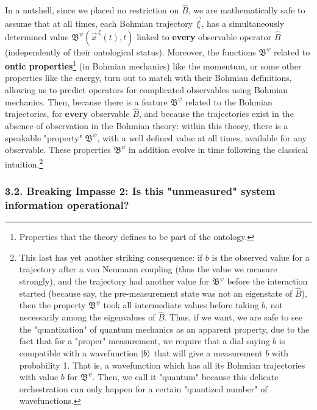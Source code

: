\documentclass[11pt, a4paper]{article} %
\newcommand{\B}{\mathfrak{B}}
\begin{document}
In a nutshell, since we placed no restriction on $\hat{B}$, we are mathematically safe to assume that at all times, each Bohmian trajectory $\vec{\xi}$, has a simultaneously determined value $\B^\psi(\vec{x}^{\:\xi}(t),t)$ linked to {\bf every} observable operator $\hat{B}$ (independently of their ontological status). Moreover, the functions $\B^\psi$ related to {\bf ontic properties}\footnote{Properties that the theory defines to be part of the ontology.} (in Bohmian mechanics) like the momentum, or some other properties like the energy, turn out to match with their Bohmian definitions, allowing us to predict operators for complicated observables using Bohmian mechanics. Then, because there is a feature $\B^\psi$ related to the Bohmian trajectories, for {\bf every} observable $\hat{B}$, and because the trajectories exist in the absence of observation in the Bohmian theory: within this theory, there is a speakable "property" $\B^\psi$, with a well defined value at all times, available for any observable. These properties $\B^\psi$ in addition evolve in time following the classical intuition.\footnote{This last has yet another striking consequence: if $b$ is the observed value for a trajectory after a von Neumann coupling (thus the value we measure strongly), and the trajectory had another value for $\B^\psi$ before the interaction started (because say, the pre-measurement state was not an eigenstate of $\hat{B}$), then the property $\B^\psi$ took all intermediate values before taking $b$, not necessarily among the eigenvalues of $\hat{B}$. Thus, if we want, we are safe to see the "quantization" of quantum mechanics as an apparent property, due to the fact that for a "proper" measurement, we require that a dial saying $b$ is compatible with a wavefunction $\ket{b}$ that will give a measurement $b$ with probability 1. That is, a wavefunction which has all its Bohmian trajectories with value $b$ for $\B^\psi$. Then, we call it "quantum" because this delicate orchestration can only happen for a certain "quantized number" of wavefunctions.}

\subsubsection*{3.2. Breaking Impasse 2: Is this "unmeasured" system information operational?}\vspace{-0.15cm}
\end{document}
